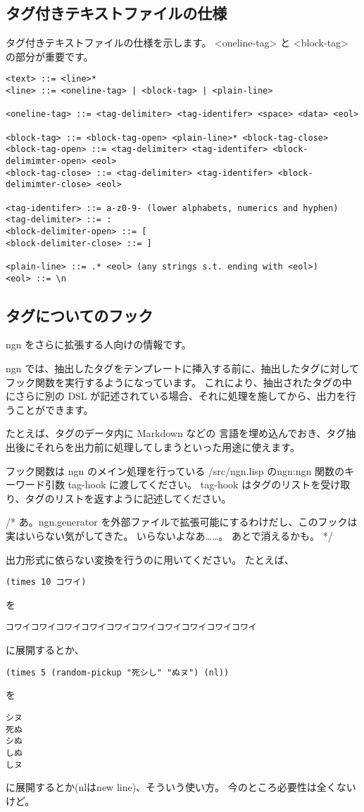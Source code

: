 \documentclass[a4j]{jsarticle}
\begin{document}
\subsection{タグ付きテキストファイルの仕様}

タグ付きテキストファイルの仕様を示します。
<oneline-tag> と <block-tag> の部分が重要です。

\begin{lstlisting}[caption=タグ付きテキストファイル]
<text> ::= <line>*
<line> ::= <oneline-tag> | <block-tag> | <plain-line>

<oneline-tag> ::= <tag-delimiter> <tag-identifer> <space> <data> <eol>

<block-tag> ::= <block-tag-open> <plain-line>* <block-tag-close>
<block-tag-open> ::= <tag-delimiter> <tag-identifer> <block-delimimter-open> <eol>
<block-tag-close> ::= <tag-delimiter> <tag-identifer> <block-delimimter-close> <eol>
  
<tag-identifer> ::= a-z0-9- (lower alphabets, numerics and hyphen)  
<tag-delimiter> ::= :
<block-delimiter-open> ::= [
<block-delimiter-close> ::= ]

<plain-line> ::= .* <eol> (any strings s.t. ending with <eol>)  
<eol> ::= \n
\end{lstlisting}


\subsection{タグについてのフック}
ngn をさらに拡張する人向けの情報です。

ngn では、抽出したタグをテンプレートに挿入する前に、抽出したタグに対してフック関数を実行するようになっています。
これにより、抽出されたタグの中にさらに別の DSL が記述されている場合、それに処理を施してから、出力を行うことができます。

たとえば、タグのデータ内に Markdown などの 言語を埋め込んでおき、タグ抽出後にそれらを出力前に処理してしまうといった用途に使えます。

フック関数は ngn のメイン処理を行っている /src/ngn.lisp のngn:ngn 関数のキーワード引数 tag-hook に渡してください。
tag-hook はタグのリストを受け取り、タグのリストを返すように記述してください。

/* 
あ。ngn.generator を外部ファイルで拡張可能にするわけだし、このフックは実はいらない気がしてきた。
いらないよなあ……。
あとで消えるかも。
 */

出力形式に依らない変換を行うのに用いてください。
たとえば、
\begin{lstlisting}
(times 10 コワイ)
\end{lstlisting}
を
\begin{lstlisting}
コワイコワイコワイコワイコワイコワイコワイコワイコワイコワイ
\end{lstlisting}
に展開するとか、
\begin{lstlisting}
(times 5 (random-pickup "死シし" "ぬヌ") (nl))
\end{lstlisting}
を
\begin{lstlisting}
シヌ
死ぬ
シぬ
しぬ
しヌ
\end{lstlisting}
に展開するとか(nlはnew line)、そういう使い方。
今のところ必要性は全くないけど。
\end{document}
